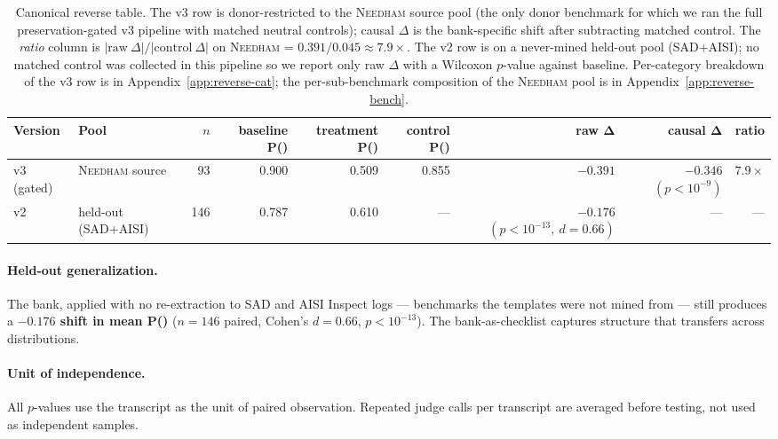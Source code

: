 \documentclass[11pt]{article}
\newcommand{\Peval}{P(\text{eval})}
\newcommand{\bench}[1]{\textsc{#1}}
\begin{document}
\begin{table}[t]
\centering\small
\setlength{\tabcolsep}{4pt}
\begin{tabular}{llrrrrrrr}
\toprule
Version & Pool & $n$ & baseline \Peval & treatment \Peval & control \Peval & raw $\bm{\Delta}$ & \textbf{causal $\bm{\Delta}$} & ratio \\
\midrule
v3 (gated) & \bench{Needham} source & 93 & 0.900 & 0.509 & 0.855 & $-0.391$ & $\bm{-0.346}$ \quad $(p<10^{-9})$ & $\bm{7.9\times}$ \\
v2         & held-out (\bench{SAD}+\bench{AISI}) & 146 & 0.787 & 0.610 & --- & $-0.176$ \quad $(p<10^{-13},\ d{=}0.66)$ & --- & --- \\
\bottomrule
\end{tabular}
\caption{Canonical reverse table. The v3 row is donor-restricted to the
\bench{Needham} source pool (the only donor benchmark for which we ran the
full preservation-gated v3 pipeline with matched neutral controls); causal
$\Delta$ is the bank-specific shift after subtracting matched control. The
\emph{ratio} column is $|\text{raw}\ \Delta| / |\text{control}\ \Delta|$ on
\bench{Needham} = $0.391/0.045 \approx 7.9\times$. The v2 row is on a never-mined
held-out pool (\bench{SAD}+\bench{AISI}); no matched control was collected in this
pipeline so we report only raw $\Delta$ with a Wilcoxon $p$-value against
baseline. Per-category breakdown of the v3 row is in
Appendix~\ref{app:reverse-cat}; the per-sub-benchmark composition of the
\bench{Needham} pool is in Appendix~\ref{app:reverse-bench}.}
\label{tab:reverse-canonical}
\end{table}

\paragraph{Held-out generalization.}
The bank, applied with no re-extraction to \bench{SAD} and AISI Inspect
logs --- benchmarks the templates were not mined from --- still produces a
\textbf{$-0.176$ shift in mean \Peval} ($n{=}146$ paired, Cohen's
$d{=}0.66$, $p<10^{-13}$). The bank-as-checklist captures structure
that transfers across distributions.

\paragraph{Unit of independence.} All $p$-values use the transcript as
the unit of paired observation. Repeated judge calls per transcript are
averaged before testing, not used as independent samples.
\end{document}
